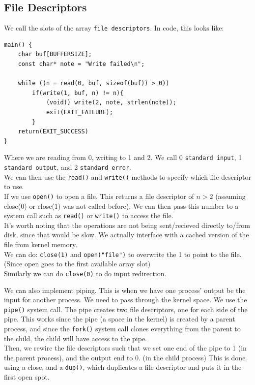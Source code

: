 \documentclass[12pt]{article}
\theoremstyle{definition}
\begin{document}
\subsection{File Descriptors}
We call the slots of the array \texttt{file descriptors}. In code, this looks like:
\begin{lstlisting}
main() {
	char buf[BUFFERSIZE];
	const char* note = "Write failed\n";
	
	while ((n = read(0, buf, sizeof(buf)) > 0))
		if(write(1, buf, n) != n){
			(void)) write(2, note, strlen(note));
			exit(EXIT_FAILURE);
		}
	return(EXIT_SUCCESS)
}
\end{lstlisting}
Where we are reading from 0, writing to 1 and 2. We call 0 \texttt{standard input}, 1 \texttt{standard output}, and 2 \texttt{standard error}.
\\ \linebreak
We can then use the \texttt{read()} and \texttt{write()} methods to specify which file descriptor to use.
\\ \linebreak
If we use \texttt{open()} to open a file. This returns a file descriptor of $n>2$ (assuming close(0) or close(1) was not called before). We can then pass this number to a system call such as \texttt{read()} or \texttt{write()} to access the file.
\\ \linebreak
It's worth noting that the operations are not being sent/recieved directly to/from disk, since that would be slow. We actually interface with a cached version of the file from kernel memory.
\\ \linebreak
We can do: \texttt{close(1)} and \texttt{open("file")} to overwrite the 1 to point to the file. (Since open goes to the first available array slot)
\\ \linebreak
Similarly we can do \texttt{close(0)} to do input redirection.
\\ \linebreak

We can also implement piping. This is when we have one process' output be the input for another process. We need to pass through the kernel space. We use the \texttt{pipe()} system call. The pipe creates two file descriptors, one for each side of the pipe. This works since the pipe (a space in the kernel) is created by a parent process, and since the \texttt{fork()} system call clones everything from the parent to the child, the child will have access to the pipe.
\\ \linebreak
Then, we rewire the file descriptors such that we set one end of the pipe to 1 (in the parent process), and the output end to 0. (in the child process) This is done using a close, and a \texttt{dup()}, which duplicates a file descriptor and puts it in the first open spot.
\end{document}
